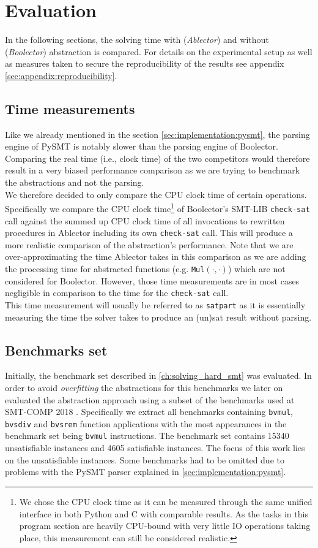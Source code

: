 \chapter{Evaluation}
\label{ch:evaluation}
In the following sections, the solving time with (\textit{Ablector}) and without (\textit{Boolector}) abstraction is compared.
For details on the experimental setup as well as measures taken to secure the reproducibility of the results see appendix \ref{sec:appendix:reproducibility}.

\section{Time measurements}
Like we already mentioned in the section \ref{sec:implementation:pysmt}, the parsing engine of PySMT is notably slower than the parsing engine of Boolector.
Comparing the real time (i.e., clock time) of the two competitors would therefore result in a very biased performance comparison as we are trying
to benchmark the abstractions and not the parsing.\\
We therefore decided to only compare the CPU clock time of certain operations.
Specifically we compare the CPU clock time\footnote{We chose the CPU clock time as it can be measured through the same unified interface in both Python and C with comparable results. As the tasks in this program section are heavily CPU-bound with very little IO operations taking place, this measurement can still be considered realistic.} of Boolector's SMT-LIB \texttt{check-sat} call
against the summed up CPU clock time of all invocations to rewritten procedures in Ablector including its own \texttt{check-sat} call.
This will produce a more realistic comparison of the abstraction's performance.
Note that we are over-approximating the time Ablector takes in this comparison as we are
adding the processing time for abstracted functions (e.g. \texttt{Mul$\left(\cdot,\cdot\right)$}) which are not considered for Boolector.
However, those time measurements are in most cases negligible in comparison to the time for the \texttt{check-sat} call.\\
This time measurement will usually be referred to as \texttt{satpart} as it is essentially measuring the time the solver takes to produce an (un)sat result without parsing.

\section{Benchmarks set}
Initially, the benchmark set described in \ref{ch:solving_hard_smt} was evaluated.
In order to avoid \textit{overfitting} the abstractions for this benchmarks we later on
evaluated the abstraction approach using a subset of the benchmarks used at SMT-COMP 2018 \cite{SMTCOMP18}.
Specifically we extract all benchmarks containing \texttt{bvmul}, \texttt{bvsdiv} and \texttt{bvsrem} function applications with the most appearances in the benchmark set being \texttt{bvmul} instructions.
The benchmark set contains 15340 unsatisfiable instances and 4605 satisfiable instances. The focus of this work lies on the unsatisfiable instances.
Some benchmarks had to be omitted due to problems with the PySMT parser explained in \ref{sec:implementation:pysmt}.

